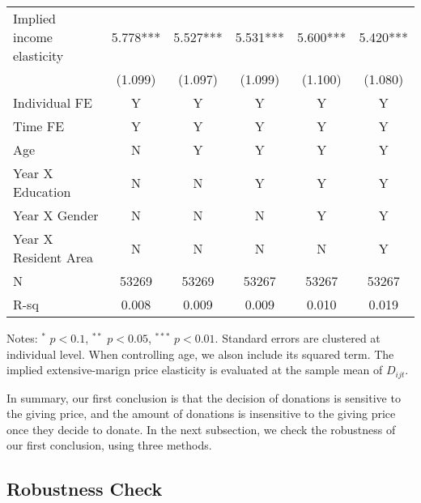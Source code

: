 \documentclass[ review  , 3p ]{elsarticle}
\begin{document}
\begin{table}
\begin{threeparttable}
\begin{tabular}[t]{lccccc}
  \hspace{1em}Implied income elasticity & 5.778*** & 5.527*** & 5.531*** & 5.600*** & 5.420***\\
  \hspace{1em} & (1.099) & (1.097) & (1.099) & (1.100) & (1.080)\\
  \hspace{1em}Individual FE & Y & Y & Y & Y & Y\\
  \hspace{1em}Time FE & Y & Y & Y & Y & Y\\
  \hspace{1em}Age & N & Y & Y & Y & Y\\
  \hspace{1em}Year X Education & N & N & Y & Y & Y\\
  \hspace{1em}Year X Gender & N & N & N & Y & Y\\
  \hspace{1em}Year X Resident Area & N & N & N & N & Y\\
  \hspace{1em}N & 53269 & 53269 & 53267 & 53267 & 53267\\
  \hspace{1em}R-sq & 0.008 & 0.009 & 0.009 & 0.010 & 0.019\\
  \bottomrule
  \end{tabular}
  \begin{tablenotes}
  \item Notes: $^{*}$ $p < 0.1$, $^{**}$ $p < 0.05$, $^{***}$ $p < 0.01$. Standard errors are clustered at individual level. When controlling age, we alson include its squared term. The implied extensive-marign price elasticity is evaluated at the sample mean of $D_{ijt}$.
  \end{tablenotes}
  \end{threeparttable}
  \end{table}

  In summary, our first conclusion is that
  the decision of donations is sensitive to the giving price,
  and the amount of donations is insensitive to the giving price once they decide to donate.
  In the next subsection, we check the robustness of our first conclusion, using three methods.

  \hypertarget{robustness-check}{%
  \subsection{Robustness Check}\label{robustness-check}}
\end{document}
